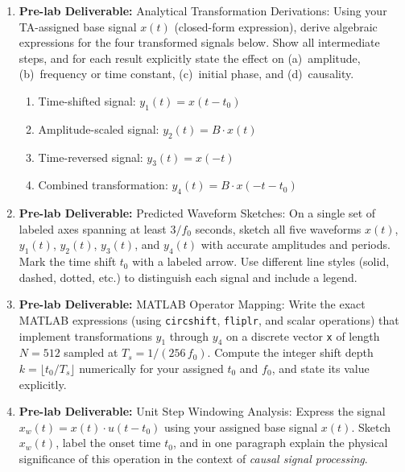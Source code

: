 \documentclass[11pt,letterpaper]{article}
\providecommand{\pldECE}[1]{\textcolor{BrickRed}{\textbf{Pre-lab Deliverable:} #1}}
\begin{document}
\begin{enumerate}
    \item \pldECE{Analytical Transformation Derivations:} Using your TA-assigned base signal $x(t)$ (closed-form expression), derive algebraic expressions for the four transformed signals below. Show all intermediate steps, and for each result explicitly state the effect on (a)~amplitude, (b)~frequency or time constant, (c)~initial phase, and (d)~causality.
    \begin{enumerate}
        \item Time-shifted signal: $y_1(t) = x(t - t_0)$
        \item Amplitude-scaled signal: $y_2(t) = B \cdot x(t)$
        \item Time-reversed signal: $y_3(t) = x(-t)$
        \item Combined transformation: $y_4(t) = B \cdot x(-t - t_0)$
    \end{enumerate}

    \item \pldECE{Predicted Waveform Sketches:} On a single set of labeled axes spanning at least $3/f_0$ seconds, sketch all five waveforms $x(t)$, $y_1(t)$, $y_2(t)$, $y_3(t)$, and $y_4(t)$ with accurate amplitudes and periods. Mark the time shift $t_0$ with a labeled arrow. Use different line styles (solid, dashed, dotted, etc.) to distinguish each signal and include a legend.

    \item \pldECE{MATLAB Operator Mapping:} Write the exact MATLAB expressions (using \texttt{circshift}, \texttt{fliplr}, and scalar operations) that implement transformations $y_1$ through $y_4$ on a discrete vector \texttt{x} of length $N = 512$ sampled at $T_s = 1/(256\,f_0)$. Compute the integer shift depth $k = \lfloor t_0 / T_s \rfloor$ numerically for your assigned $t_0$ and $f_0$, and state its value explicitly.

    \item \pldECE{Unit Step Windowing Analysis:} Express the signal $x_w(t) = x(t) \cdot u(t - t_0)$ using your assigned base signal $x(t)$. Sketch $x_w(t)$, label the onset time $t_0$, and in one paragraph explain the physical significance of this operation in the context of \emph{causal signal processing}.
\end{enumerate}

\clearpage

\clearpage

\end{document}

